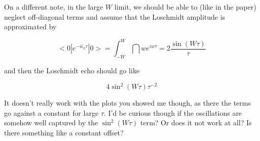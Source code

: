 \documentclass{article}
\numberwithin{equation}{section}
\newcommand{\1}{\mathbb{1}}
\begin{document}
On a different note, in the large $W$ limit, we should be able to (like in the paper) neglect off-diagonal terms and assume that the Loschmidt amplitude is approximated by

$$<0| e^{-i \epsilon_k \tau} | 0> = \int_{-W}^W \dint{w} e^{i w \tau} = 2 \frac{\sin(W \tau)}{\tau}$$

and then the Loschmidt echo should go like

$$4 \sin^2(W \tau) \tau^{-2}$$

It doesn’t really work with the plots you showed me though, as there the terms go against a constant for large $\tau.$ I’d be curious though if the oscillations are somehow well captured by the $\sin^2(W \tau)$ term? Or does it not work at all? Is there something like a constant offset?
\end{document}
